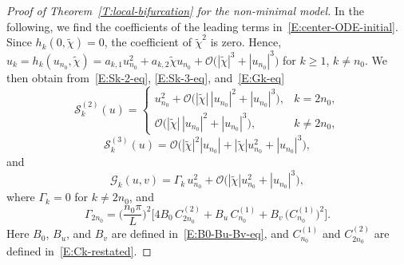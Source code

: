 \documentclass[11pt]{article} %
\theoremstyle{remark}
\theoremstyle{remark}
\numberwithin{equation}{section}
\numberwithin{figure}{section}
\numberwithin{table}{section}
\begin{document}
\begin{proof}[Proof of Theorem~\ref{T:local-bifurcation}  for the non-minimal model]
  In the following, we find the coefficients of the leading terms
  in~\eqref{E:center-ODE-initial}. Since $h_k(0, \tilde{\chi}) = 0$, the
  coefficient of $\tilde{\chi}^2$ is zero. Hence, $u_k = h_k(u_{n_0}, \tilde{\chi})
  = a_{k,1}u_{n_0}^2 + a_{k,2}\tilde{\chi}u_{n_0} +
  \mathcal{O}\Big(|\tilde{\chi}|^3 + |u_{n_0}|^3\Big)$ for $k \ge 1$, $k \ne
  n_0$. We then obtain from~\eqref{E:Sk-2-eq}, \eqref{E:Sk-3-eq},
  and~\eqref{E:Gk-eq}
  \begin{equation}\label{E:S2-k-eq-new}
    \mathcal{S}^{(2)}_k(u)
    = \begin{cases}
      u_{n_0}^2 + \mathcal{O}\Big(|\tilde{\chi}|\,|u_{n_0}|^2 + |u_{n_0}|^3\Big),
      & k = 2 n_0, \\
      \mathcal{O}\Big(|\tilde{\chi}|\,|u_{n_0}|^2 + |u_{n_0}|^3\Big),
      & k \ne 2 n_0,
    \end{cases}
  \end{equation}
  \begin{equation}\label{E:S3-k-eq-new}
    \mathcal{S}^{(3)}_k(u)=\mathcal{O} \Big(|\tilde{\chi}|^2
    |u_{n_0}|+|\tilde{\chi}| u_{n_0}^2 + |u_{n_0}|^3\Big),
  \end{equation}
  and
  \begin{equation}\label{E:Gk-eq-new}
    \mathcal{G}_k(u,v)
    = \Gamma_k\, u_{n_0}^2 + \mathcal{O}\Big(|\tilde{\chi}|  u_{n_0}^2 +
    |u_{n_0}|^3\Big),
  \end{equation}
  where $\Gamma_k = 0$ for $k \ne 2 n_0$, and
  \begin{equation}\label{E:Gamma2n0-explicit}
    \Gamma_{2n_0}
    = \Big(\frac{n_0\pi}{L}\Big)^2
    \Big[
    4B_0\,C_{2n_0}^{(2)}
    + B_u\,C_{n_0}^{(1)}
    + B_v\,\bigl(C_{n_0}^{(1)}\bigr)^2
    \Big].
  \end{equation}
  Here $B_0$, $B_u$, and $B_v$ are defined in~\eqref{E:B0-Bu-Bv-eq}, and
  $C_{n_0}^{(1)}$ and $C_{2n_0}^{(2)}$ are defined in~\eqref{E:Ck-restated}.



\end{proof}
\end{document}
